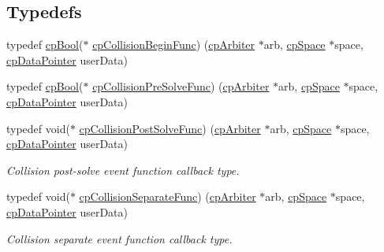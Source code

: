 \subsection*{Typedefs}
\begin{DoxyCompactItemize}
\item 
typedef \mbox{\hyperlink{group__basic_types_gabc5e752c48f3449ca26ef413ecbd647e}{cp\+Bool}}($\ast$ \mbox{\hyperlink{group__cp_space_ga3134f145bfc7ca4ef69b350978c26a5a}{cp\+Collision\+Begin\+Func}}) (\mbox{\hyperlink{structcp_arbiter}{cp\+Arbiter}} $\ast$arb, \mbox{\hyperlink{structcp_space}{cp\+Space}} $\ast$space, \mbox{\hyperlink{group__basic_types_ga2ac2c3c31e21893941f9e4f8ee279447}{cp\+Data\+Pointer}} user\+Data)
\item 
typedef \mbox{\hyperlink{group__basic_types_gabc5e752c48f3449ca26ef413ecbd647e}{cp\+Bool}}($\ast$ \mbox{\hyperlink{group__cp_space_ga89b24d53d81a5a028198c3c2d3c39a9d}{cp\+Collision\+Pre\+Solve\+Func}}) (\mbox{\hyperlink{structcp_arbiter}{cp\+Arbiter}} $\ast$arb, \mbox{\hyperlink{structcp_space}{cp\+Space}} $\ast$space, \mbox{\hyperlink{group__basic_types_ga2ac2c3c31e21893941f9e4f8ee279447}{cp\+Data\+Pointer}} user\+Data)
\item 
\mbox{\label{group__cp_space_gaccb60bbb090c97823f49ee49e4e5d3c3}} 
typedef void($\ast$ \mbox{\hyperlink{group__cp_space_gaccb60bbb090c97823f49ee49e4e5d3c3}{cp\+Collision\+Post\+Solve\+Func}}) (\mbox{\hyperlink{structcp_arbiter}{cp\+Arbiter}} $\ast$arb, \mbox{\hyperlink{structcp_space}{cp\+Space}} $\ast$space, \mbox{\hyperlink{group__basic_types_ga2ac2c3c31e21893941f9e4f8ee279447}{cp\+Data\+Pointer}} user\+Data)
\begin{DoxyCompactList}\small\item\em Collision post-\/solve event function callback type. \end{DoxyCompactList}\item 
\mbox{\label{group__cp_space_ga01427ab634c483879cfed5bb22610487}} 
typedef void($\ast$ \mbox{\hyperlink{group__cp_space_ga01427ab634c483879cfed5bb22610487}{cp\+Collision\+Separate\+Func}}) (\mbox{\hyperlink{structcp_arbiter}{cp\+Arbiter}} $\ast$arb, \mbox{\hyperlink{structcp_space}{cp\+Space}} $\ast$space, \mbox{\hyperlink{group__basic_types_ga2ac2c3c31e21893941f9e4f8ee279447}{cp\+Data\+Pointer}} user\+Data)
\begin{DoxyCompactList}\small\item\em Collision separate event function callback type. \end{DoxyCompactList}\item 

\end{DoxyCompactItemize}
